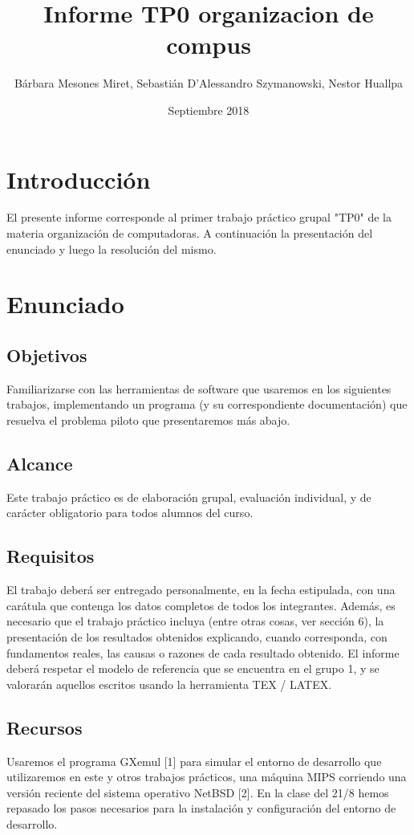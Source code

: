 \documentclass{article}
\title{Informe TP0 organizacion de compus}
\author{Bárbara Mesones Miret,  Sebastián D'Alessandro Szymanowski, Nestor Huallpa }
\date{Septiembre 2018}
\begin{document}
\maketitle

\section{Introducción}

El presente informe corresponde al primer trabajo práctico grupal "TP0" de la materia organización de computadoras.
A continuación la presentación del enunciado y luego la resolución del mismo.

\section{Enunciado}


\subsection{Objetivos}
Familiarizarse con las herramientas de software que usaremos en los siguientes trabajos, implementando un programa (y su correspondiente documentación) que resuelva el problema piloto que presentaremos más abajo.

\subsection{Alcance}
Este trabajo práctico es de elaboración grupal, evaluación individual, y de
carácter obligatorio para todos alumnos del curso.

\subsection{Requisitos}
El trabajo deberá ser entregado personalmente, en la fecha estipulada, con
una carátula que contenga los datos completos de todos los integrantes.
Además, es necesario que el trabajo práctico incluya (entre otras cosas, ver
sección 6), la presentación de los resultados obtenidos explicando, cuando corresponda, con fundamentos reales, las causas o razones de cada resultado obtenido.
El informe deberá respetar el modelo de referencia que se encuentra en el
grupo 1, y se valorarán aquellos escritos usando la herramienta TEX / LATEX.

\subsection{Recursos}
Usaremos el programa GXemul [1] para simular el entorno de desarrollo que
utilizaremos en este y otros trabajos prácticos, una máquina MIPS corriendo
una versión reciente del sistema operativo NetBSD [2].
En la clase del 21/8 hemos repasado los pasos necesarios para la instalación
y configuración del entorno de desarrollo.
\end{document}
